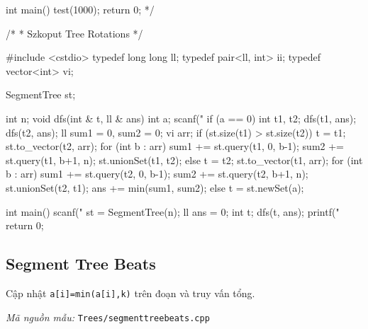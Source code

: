 \documentclass[11pt]{article}
\newcommand{\codepath}[1]{\par\noindent\textit{Mã nguồn mẫu:} \texttt{#1}\par}
\begin{document}
\begin{vncode}
int main() {
	test(1000);
	return 0;
}*/

/*
 * Szkoput Tree Rotations
 */

#include <cstdio>
typedef long long ll;
typedef pair<ll, int> ii;
typedef vector<int> vi;

SegmentTree st;

int n;
void dfs(int & t, ll & ans) {
	int a;
	scanf("%
	if (a == 0) {
		int t1, t2;
		dfs(t1, ans);
		dfs(t2, ans);
		ll sum1 = 0, sum2 = 0;
		vi arr;
		if (st.size(t1) > st.size(t2)) {
			t = t1;
			st.to_vector(t2, arr);
			for (int b : arr) {
				sum1 += st.query(t1, 0, b-1);
				sum2 += st.query(t1, b+1, n);
			}
			st.unionSet(t1, t2);
		}
		else {
			t = t2;
			st.to_vector(t1, arr);
			for (int b : arr) {
				sum1 += st.query(t2, 0, b-1);
				sum2 += st.query(t2, b+1, n);
			}
			st.unionSet(t2, t1);
		}
		ans += min(sum1, sum2);
	}
	else {
		t = st.newSet(a);
	}
}

int main() {
	scanf("%
	st = SegmentTree(n);
	ll ans = 0;
	int t;
	dfs(t, ans);
	printf("%
	return 0;
}
\end{vncode}
\endgroup


\subsection{Segment Tree Beats}

Cập nhật \texttt{a[i]=min(a[i],k)} trên đoạn và truy vấn tổng.

\codepath{Trees/segmenttreebeats.cpp}
\end{document}
